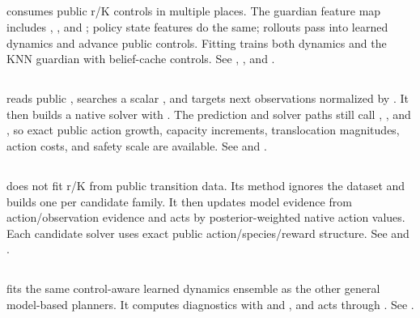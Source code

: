 \documentclass[11pt]{article}
\begin{document}
\subsection{}

 consumes public r/K controls in multiple places. The guardian
feature map includes , , and ;
policy state features do the same; rollouts pass  into learned
dynamics and advance public controls. Fitting trains both dynamics and the KNN
guardian with belief-cache controls. See ,
, and .

\subsection{}

 reads public , searches a scalar
, and targets next observations normalized by . It then
builds a native solver with . The prediction and
solver paths still call , , and
, so exact public action growth, capacity increments,
translocation magnitudes, action costs, and safety scale are available. See
 and .

\subsection{}

 does not fit r/K from public transition data. Its 
method ignores the dataset and builds one  per candidate
family. It then updates model evidence from action/observation evidence and
acts by posterior-weighted native action values. Each candidate solver uses exact
public action/species/reward structure. See  and
.

\subsection{}

 fits the same control-aware learned dynamics ensemble as the other
general model-based planners. It computes diagnostics with 
and , and acts through . See
.
\end{document}
